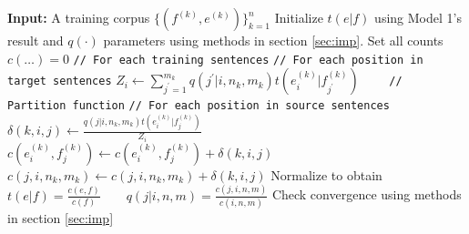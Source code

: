 \documentclass[letterpaper]{article}
\begin{document}
\begin{algorithm}[t]
\caption{\label{alg:ibm2} {\bf IBM Model 2}}
\begin{algorithmic}[1]
\STATE \textbf{Input:} A training corpus $\{ (f^{(k)}, e^{(k)}) \}_{k=1}^n$
\STATE Initialize $t(e | f)$ using Model 1's result and $q(\cdot)$ parameters using
methods in section \ref{sec:imp}.
	\STATE Set all counts $c(\dots) = 0$
	\STATE \texttt{// For each training sentences}
		\STATE \texttt{// For each position in target sentences}
			\STATE $Z_i \leftarrow 
			\sum_{j^\prime = 1}^{m_k} q(j^\prime | i, n_k, m_k) t(e_i^{(k)} | f_{j^\prime}^{(k)}) \qquad$
			\texttt{// Partition function}
			\STATE \texttt{// For each position in source sentences}
				\STATE $\delta(k, i,  j) \leftarrow \frac{q(j | i, n_k, m_k) t(e_i^{(k)} | f_j^{(k)})}{Z_i}$
				\STATE $c(e_i^{(k)}, f_j^{(k)}) \leftarrow c(e_i^{(k)}, f_j^{(k)}) + \delta(k, i, j)$
				\STATE $c(j, i, n_k, m_k) \leftarrow c(j, i, n_k, m_k) + \delta(k, i, j)$
			\ENDFOR
		\ENDFOR
	\ENDFOR
	\STATE Normalize to obtain $t(e | f) = \frac{c(e, f)}{c(f)} \qquad q(j | i, n, m) = \frac{c(j, i, n, m)}{c(i, n, m)}$
	\STATE Check convergence using methods in section \ref{sec:imp}
\ENDFOR
\end{algorithmic}
\end{algorithm}
\end{document}
